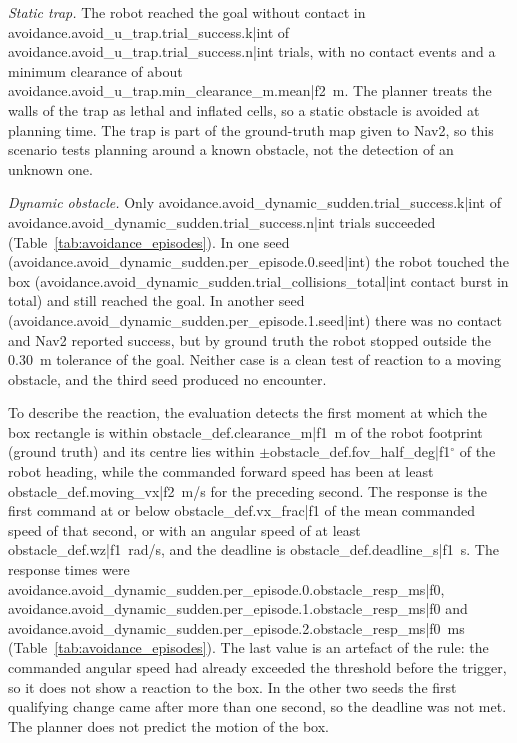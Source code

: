 \noindent\textit{Static trap.} The robot reached the goal without contact in {{avoidance.avoid_u_trap.trial_success.k|int}} of {{avoidance.avoid_u_trap.trial_success.n|int}} trials, with no contact events and a minimum clearance of about {{avoidance.avoid_u_trap.min_clearance_m.mean|f2}}~m. The planner treats the walls of the trap as lethal and inflated cells, so a static obstacle is avoided at planning time. The trap is part of the ground-truth map given to Nav2, so this scenario tests planning around a known obstacle, not the detection of an unknown one.

\noindent\textit{Dynamic obstacle.} Only {{avoidance.avoid_dynamic_sudden.trial_success.k|int}} of {{avoidance.avoid_dynamic_sudden.trial_success.n|int}} trials succeeded (Table~\ref{tab:avoidance_episodes}). In one seed ({{avoidance.avoid_dynamic_sudden.per_episode.0.seed|int}}) the robot touched the box ({{avoidance.avoid_dynamic_sudden.trial_collisions_total|int}} contact burst in total) and still reached the goal. In another seed ({{avoidance.avoid_dynamic_sudden.per_episode.1.seed|int}}) there was no contact and Nav2 reported success, but by ground truth the robot stopped outside the 0.30~m tolerance of the goal. Neither case is a clean test of reaction to a moving obstacle, and the third seed produced no encounter.

To describe the reaction, the evaluation detects the first moment at which the box rectangle is within {{obstacle_def.clearance_m|f1}}~m of the robot footprint (ground truth) and its centre lies within $\pm${{obstacle_def.fov_half_deg|f1}}$^{\circ}$ of the robot heading, while the commanded forward speed has been at least {{obstacle_def.moving_vx|f2}}~m/s for the preceding second. The response is the first command at or below {{obstacle_def.vx_frac|f1}} of the mean commanded speed of that second, or with an angular speed of at least {{obstacle_def.wz|f1}}~rad/s, and the deadline is {{obstacle_def.deadline_s|f1}}~s. The response times were {{avoidance.avoid_dynamic_sudden.per_episode.0.obstacle_resp_ms|f0}}, {{avoidance.avoid_dynamic_sudden.per_episode.1.obstacle_resp_ms|f0}} and {{avoidance.avoid_dynamic_sudden.per_episode.2.obstacle_resp_ms|f0}}~ms (Table~\ref{tab:avoidance_episodes}). The last value is an artefact of the rule: the commanded angular speed had already exceeded the threshold before the trigger, so it does not show a reaction to the box. In the other two seeds the first qualifying change came after more than one second, so the deadline was not met. The planner does not predict the motion of the box.

